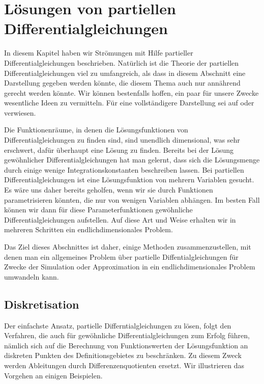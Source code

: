 %
%
%
\section{Lösungen von partiellen Differentialgleichungen%
\label{section:pdeloesungen}}
In diesem Kapitel haben wir Strömungen mit Hilfe partieller
Differentialgleichungen beschrieben.
Natürlich ist die Theorie der partiellen Differentialgleichungen viel
zu umfangreich, als dass in diesem Abschnitt eine Darstellung gegeben
werden könnte, die diesem Thema auch nur annährend gerecht werden könnte.
Wir können bestenfalls hoffen, ein paar für unsere Zwecke wesentliche
Ideen zu vermitteln.
Für eine vollständigere Darstellung sei auf \cite{skript:pde}
oder \cite{skript:part-diff} verwiesen.

Die Funktionenräume, in denen die Lösungsfunktionen von Differentialgleichungen
zu finden sind, sind unendlich dimensional, was sehr erschwert,
dafür überhaupt eine Lösung zu finden.
Bereits bei der Lösung gewöhnlicher Differentialgleichungen hat man
gelernt, dass sich die Lösungsmenge durch einige wenige Integrationskonstanten
beschreiben lassen.
Bei partiellen Differentialgleichungen ist eine Lösungsfunktion von
mehrern Variablen gesucht.
Es wäre uns daher bereits geholfen, wenn wir sie durch
Funktionen parametrisieren könnten, die nur von wenigen Variablen
abhängen.
Im besten Fall können wir dann für diese Parameterfunktionen gewöhnliche
Differentialgleichungen aufstellen.
Auf diese Art und Weise erhalten wir in mehreren Schritten ein
endlichdimensionales Problem.

Das Ziel dieses Abschnittes ist daher, einige Methoden zusammenzustellen,
mit denen man ein allgemeines Problem über partielle Diffentialgleichungen
für Zwecke der Simulation oder Approximation
in ein endlichdimensionales Problem umwandeln kann.

\subsection{Diskretisation\label{section:diskretisation}}
Der einfachste Ansatz, partielle Differntialgleichungen zu lösen,
folgt den Verfahren, die auch für gewöhnliche Differentialgleichungen
\cite{skript:mathsem-dgl} 
zum Erfolg führen, nämlich sich auf die Berechnung von Funktionswerten
der Lösungsfunktion an diskreten Punkten des Definitionsgebietes zu
beschränken.
Zu diesem Zweck werden Ableitungen durch Differenzenquotienten ersetzt.
Wir illustrieren das Vorgehen an einigen Beispielen.

